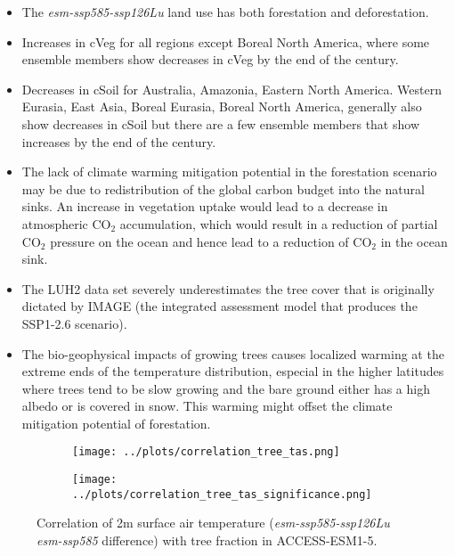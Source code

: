 \documentclass[]{article}
\begin{document}
\begin{itemize}
    \item The \textit{esm-ssp585-ssp126Lu} land use has both forestation and deforestation.
    \item Increases in cVeg for all regions except Boreal North America, where some ensemble members show decreases in cVeg by the end of the century.
    \item Decreases in cSoil for Australia, Amazonia, Eastern North America. Western Eurasia, East Asia, Boreal Eurasia, Boreal North America, generally also show decreases in cSoil but there are a few ensemble members that show increases by the end of the century.
\end{itemize}

\begin{itemize}
    \item The lack of climate warming mitigation potential in the forestation scenario may be due to redistribution of the global carbon budget into the natural sinks. An increase in vegetation uptake would lead to a decrease in atmospheric CO$_2$ accumulation, which would result in a reduction of partial CO$_2$ pressure on the ocean and hence lead to a reduction of CO$_2$ in the ocean sink.
    \item The LUH2 data set severely underestimates the tree cover that is originally dictated by IMAGE (the integrated assessment model that produces the SSP1-2.6 scenario).
    \item The bio-geophysical impacts of growing trees causes localized warming at the extreme ends of the temperature distribution, especial in the higher latitudes where trees tend to be slow growing and the bare ground either has a high albedo or is covered in snow. This warming might offset the climate mitigation potential of forestation.
\end{itemize}

\begin{figure}[H]
    \centering
    \begin{subfigure}[b]{0.5\linewidth}
        \texttt{[image: ../plots/correlation\_tree\_tas.png]}
    \end{subfigure}

    \begin{subfigure}[b]{0.5\linewidth}
        \texttt{[image: ../plots/correlation\_tree\_tas\_significance.png]}
    \end{subfigure}
    \caption{Correlation of 2m surface air temperature (\textit{esm-ssp585-ssp126Lu} \textit{esm-ssp585} difference) with tree fraction in ACCESS-ESM1-5.}
    \label{fig:map_tas_tree_correlation}
\end{figure}
\end{document}
